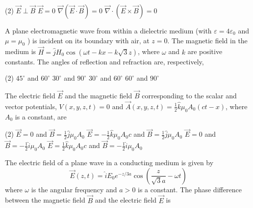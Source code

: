\begin{enumerate}
\begin{minipage}{\textwidth}
\end{minipage}
\begin{tasks}(2)
	\task[\textbf{A.}] $\vec{E} \perp \vec{B}$
	\task[\textbf{B.}]$\vec{E}=0$
	\task[\textbf{C.}]$\vec{\nabla}(\vec{E} \cdot \vec{B})=0$
	\task[\textbf{D.}]$\vec{\nabla} \cdot(\vec{E} \times \vec{B})=0$
\end{tasks}
\begin{minipage}{\textwidth}
	\item A plane electromagnetic wave from within a dielectric medium (with $\varepsilon=4 \varepsilon_{0}$ and $\mu=\mu_{0}$ ) is incident on its boundary with air, at $z=0$. The magnetic field in the medium is $\vec{H}=\hat{j} H_{0} \cos (\omega t-k x-k \sqrt{3} z)$, where $\omega$ and $k$ are positive constants.
	The angles of reflection and refraction are, respectively,
\end{minipage}
\begin{tasks}(2)
	\task[\textbf{A.}] $45^{\circ}$ and $60^{\circ}$
	\task[\textbf{B.}]$30^{\circ}$ and $90^{\circ}$
	\task[\textbf{C.}]$30^{\circ}$ and $60^{\circ}$
	\task[\textbf{D.}]$60^{\circ}$ and $90^{\circ}$
\end{tasks}
\begin{minipage}{\textwidth}
	\item The electric field $\vec{E}$ and the magnetic field $\vec{B}$ corresponding to the scalar and vector potentials, $V(x, y, z, t)=0$ and $\vec{A}(x, y, z, t)=\frac{1}{2} \hat{k} \mu_{0} A_{0}(c t-x)$, where $A_{0}$ is a constant, are
\end{minipage}
\begin{tasks}(2)
	\task[\textbf{A.}] $\vec{E}=0$ and $\vec{B}=\frac{1}{2} \hat{j} \mu_{0} A_{0}$
	\task[\textbf{B.}] $\vec{E}=-\frac{1}{2} \hat{k} \mu_{0} A_{0} c$ and $\vec{B}=\frac{1}{2} \hat{j} \mu_{0} A_{0}$
	\task[\textbf{C.}]$\vec{E}=0$ and $\vec{B}=-\frac{1}{2} \hat{i} \mu_{0} A_{0}$
	\task[\textbf{D.}]$\vec{E}=\frac{1}{2} \hat{k} \mu_{0} A_{0} c$ and $\vec{B}=-\frac{1}{2} \hat{i} \mu_{0} A_{0}$
\end{tasks}
\begin{minipage}{\textwidth}
	\item The electric field of a plane wave in a conducting medium is given by
	$$
	\vec{E}(z, t)=\hat{i} E_{0} e^{-z / 3 a} \cos \left(\frac{z}{\sqrt{3} a}-\omega t\right)
	$$
	where $\omega$ is the angular frequency and $a>0$ is a constant. The phase difference between the magnetic field $\vec{B}$ and the electric field $\vec{E}$ is

\end{minipage}
\end{enumerate}
